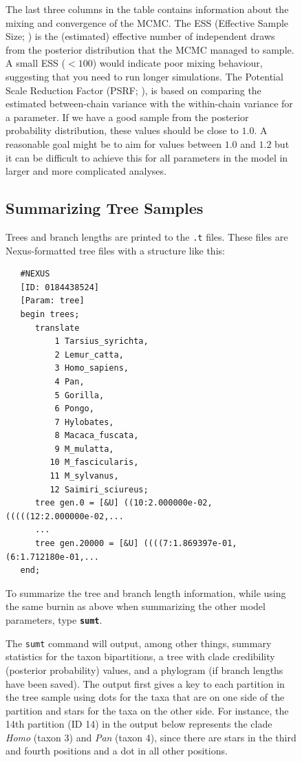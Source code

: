\documentclass[12pt]{book}
\newcommand{\ttt}[1]{\texttt{#1}}
\newcommand{\tb}[1]{\ttt{\textbf{#1}}}
\begin{document}
\begin{figure}[h]
The last three columns in the table contains information about the mixing and convergence of the
MCMC. The ESS (Effective Sample Size; \citet{ripley87}) is the (estimated) effective number of
independent draws from the posterior distribution that the MCMC managed to sample. A small ESS
($<100$) would indicate poor mixing behaviour, suggesting that you need to run longer simulations.
The Potential Scale Reduction Factor (PSRF; \citet{gelman92}), is based on comparing the estimated
between-chain variance with the within-chain variance for a parameter. If we have a good sample
from the posterior probability distribution, these values should be close to $1.0$. A reasonable
goal might be to aim for values between $1.0$ and $1.2$ but it can be difficult to achieve this
for all parameters in the model in larger and more complicated analyses.

\subsection{Summarizing Tree Samples}

Trees and branch lengths are printed to the \ttt{.t} files. These files are Nexus-formatted tree
files with a structure like this:

\begin{singlespacing}
\footnotesize
\begin{verbatim}
   #NEXUS
   [ID: 0184438524]
   [Param: tree]
   begin trees;
      translate
          1 Tarsius_syrichta,
          2 Lemur_catta,
          3 Homo_sapiens,
          4 Pan,
          5 Gorilla,
          6 Pongo,
          7 Hylobates,
          8 Macaca_fuscata,
          9 M_mulatta,
         10 M_fascicularis,
         11 M_sylvanus,
         12 Saimiri_sciureus;
      tree gen.0 = [&U] ((10:2.000000e-02,(((((12:2.000000e-02,...
      ...
      tree gen.20000 = [&U] ((((7:1.869397e-01,(6:1.712180e-01,...
   end;
\end{verbatim}
\normalsize
\end{singlespacing}

To summarize the tree and branch length information, while using the same burnin as above when
summarizing the other model parameters, type \tb{sumt}.

The \ttt{sumt} command will output, among other things, summary statistics for the taxon
bipartitions, a tree with clade credibility (posterior probability) values, and a phylogram (if
branch lengths have been saved). The output first gives a key to each partition in the tree sample
using dots for the taxa that are on one side of the partition and stars for the taxa on the other
side. For instance, the 14th partition (ID 14) in the output below represents the clade
\textit{Homo} (taxon 3) and \textit{Pan} (taxon 4), since there are stars in the third and fourth
positions and a dot in all other positions.


\end{figure}
\end{document}
